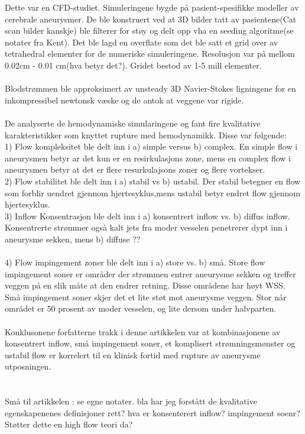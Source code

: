 \documentclass{article}
\begin{document}
Dette var en CFD-studiet. Simuleringene bygde på pasient-spesifikke modeller av cerebrale aneurysmer. De ble konstruert ved at 3D bilder tatt av pasientene(Cat scan bilder kanskje) ble filterer for støy og delt opp vha en seeding algoritme(se notater fra Kent). Det ble lagd en overflate som det ble satt et grid over av tetrahedral elementer for de numeriske simuleringene. 
Resolusjon var på mellom 0.02cm - 0.01 cm(hva betyr det?).
Gridet bestod av 1-5 mill elementer.
\\
\\Blodstrømmen ble approksimert av unsteady 3D Navier-Stokes ligningene for en inkompressibel newtonsk væske og de antok at veggene var rigide. 
\\
\\De analyserte de hemodynamiske simularingene og fant fire kvalitative karakteristikker som knyttet rupture med hemodynamikk. Disse var følgende: 
\\1) Flow kompleksitet ble delt inn i a) simple versus b) complex.
En simple flow i aneurysmen betyr ar det kun er en resirkulasjons zone, mens en complex flow i aneurysmen betyr at det er flere resurkulajsons zoner og flere vortekser. 
\\2) Flow stabilitet ble delt inn i a) stabil vs b) ustabil. Der stabil betegner en flow som forblir uendret gjennom hjertesyklus,mens ustabil betyr endret flow gjennom hjertesyklus.  
\\3) Inflow Konsentrasjon ble delt inn i a) konsentrert inflow vs. b) diffus inflow. Konsentrerte strømmer også kalt jets fra moder vesselen penetrerer dypt inn i aneurysme sekken, mens b) diffuse ?? 
\\
\\4) Flow impingement zoner ble delt inn i a) store vs. b) små. Store flow impingement soner er områder der strømmen entrer aneurysme sekken og treffer veggen på en slik måte at den endrer retning. Disse områdene har høyt WSS. 
Små impingement soner skjer det et lite støt mot aneurysme veggen. 
Stor når området er 50 prosent av moder vesselen, og lite dersom under halvparten. 
\\
\\ Konklusonene forfatterne trakk i denne artikkelen var at kombinasjonene av konsentrert inflow, små impingement soner, et komplisert strømningsmønster og ustabil flow er korrelert til en klinisk fortid med rupture av aneurysme utposningen. 
\\
\\
\\Små til artikkelen : se egne notater. bla har jeg forstått de kvalitative egenskapenenes definisjoner rett? hva er konsenterert inflow? impingement soenr? Støtter dette en high flow teori da? 
\end{document}
